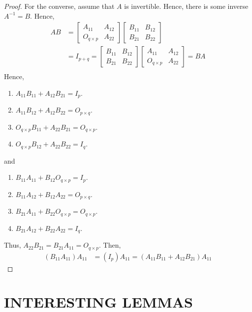 \documentclass[12pt]{article}
\newenvironment{problem}[2][Problem]{\begin{trivlist} \item[\hskip \labelsep {\bfseries #1}\hskip \labelsep {\bfseries #2.}]}{\end{trivlist}}
\begin{document}
\begin{problem}{1.24}
\begin{proof}
For the converse, assume that $A$ is invertible. Hence, there is some inverse $A^{-1}=B$. Hence, 
\begin{align*}
  AB &=  \begin{bmatrix} A_{11} & A_{12} \\ O_{q\times p} & A_{22}\end{bmatrix}\begin{bmatrix}B_{11} & B_{12} \\ B_{21} & B_{22} \end{bmatrix}\\
  &=  I_{p+q} =  \begin{bmatrix}B_{11} & B_{12} \\ B_{21} & B_{22} \end{bmatrix} \begin{bmatrix} A_{11} & A_{12} \\ O_{q\times p} & A_{22}\end{bmatrix} = BA\\
\end{align*}
Hence, 
\begin{enumerate}
  \item $A_{11}B_{11} + A_{12}B_{21} = I_{p}$.
  \item $A_{11}B_{12} + A_{12}B_{22} = O_{p\times q}$.
  \item $O_{q\times p}B_{11} + A_{22}B_{21} = O_{q\times p}$.
  \item $O_{q\times p}B_{12} + A_{22}B_{22} = I_{q}$.
\end{enumerate}
and
\begin{enumerate}
  \item $B_{11}A_{11} + B_{12}O_{q\times p} = I_{p}$.
  \item $B_{11}A_{12} + B_{12}A_{22} = O_{p\times q}$.
  \item $B_{21}A_{11} + B_{22}O_{q\times p} = O_{q\times p}$.
  \item $B_{21}A_{12} + B_{22}A_{22} = I_{q}$.
\end{enumerate}
Thus, $A_{22}B_{21} = B_{21}A_{11} = O_{q\times p}$. Then,  
\begin{align*}
  (B_{11}A_{11})A_{11} &= (I_{p})A_{11} = (A_{11}B_{11}+A_{12}B_{21})A_{11} 
\end{align*}
\end{proof}
\end{problem}
\section{INTERESTING LEMMAS}
\end{document}
